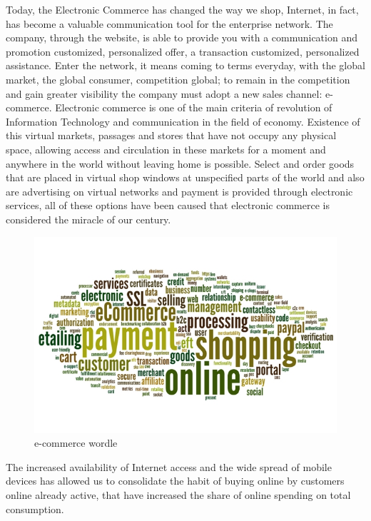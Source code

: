Today, the Electronic Commerce has changed the way we shop, Internet, in fact, has become a valuable communication tool for the enterprise network.
The company, through the website, is able to provide you with a communication and promotion customized, personalized offer, a transaction customized, personalized assistance. Enter the network, it means coming to terms everyday, with the global market, the global consumer, competition global; to remain in the competition and gain greater visibility the company must adopt a new sales channel: e-commerce.
\newline
Electronic commerce is one of the main criteria of revolution of Information Technology and communication in the field of economy. Existence of this virtual markets, passages and stores that have not occupy any physical space, allowing access and circulation in these markets for a moment and anywhere in the world without leaving home is possible. Select and order goods that are placed in virtual shop windows at unspecified parts of the world and also are advertising on virtual networks and payment is provided through electronic services, all of these options have been caused that electronic commerce is considered the miracle of our century.
\newline
\begin{figure}[htb]
 \centering
 \includegraphics[width=1.0\linewidth]{images/introduction/ecommerce-wordle.jpg}\hfill
 \caption[e-commerce wordle]{e-commerce wordle}
 \label{fig:e_commerce_wordle}
\end{figure}
The increased availability of Internet access and the wide spread of mobile devices has allowed us to consolidate the habit of buying online by customers online already active, that have increased the share of online spending on total consumption.
